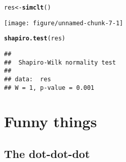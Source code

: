 \documentclass[12pt,a4paper]{scrartcl}\usepackage[]{graphicx}\usepackage[]{color}
\makeatletter
\def\maxwidth{ %
  \ifdim\Gin@nat@width>\linewidth
    \linewidth
  \else
    \Gin@nat@width
  \fi
}
\newcommand{\hlstd}[1]{\textcolor[rgb]{0.345,0.345,0.345}{#1}}%
\newcommand{\hlkwb}[1]{\textcolor[rgb]{0.69,0.353,0.396}{#1}}%
\newcommand{\hlkwd}[1]{\textcolor[rgb]{0.737,0.353,0.396}{\textbf{#1}}}%
\newenvironment{kframe}{%
 \def\at@end@of@kframe{}%
 \ifinner\ifhmode%
  \def\at@end@of@kframe{\end{minipage}}%
  \begin{minipage}{\columnwidth}%
 \fi\fi%
 \def\FrameCommand##1{\hskip\@totalleftmargin \hskip-\fboxsep
 \colorbox{shadecolor}{##1}\hskip-\fboxsep
     \hskip-\linewidth \hskip-\@totalleftmargin \hskip\columnwidth}%
 \MakeFramed {\advance\hsize-\width
   \@totalleftmargin\z@ \linewidth\hsize
   \@setminipage}}%
 {\par\unskip\endMakeFramed%
 \at@end@of@kframe}
\newenvironment{knitrout}{}{} %
\makeatother
\begin{document}
\begin{Answer}
\begin{knitrout}
\begin{kframe}
\begin{alltt}
\hlstd{res} \hlkwb{<-} \hlkwd{simclt}\hlstd{()}
\end{alltt}
\end{kframe}
\texttt{[image: figure/unnamed-chunk-7-1]} 
\begin{kframe}\begin{alltt}
\hlkwd{shapiro.test}\hlstd{(res)}
\end{alltt}
\begin{verbatim}
## 
## 	Shapiro-Wilk normality test
## 
## data:  res
## W = 1, p-value = 0.001
\end{verbatim}
\end{kframe}
\end{knitrout}
\end{Answer}

\section{Funny things}

\subsection{The dot-dot-dot}
\end{document}
